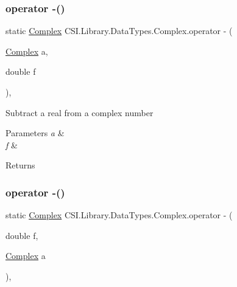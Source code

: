 \subsubsection{\texorpdfstring{operator -\/()}{operator -()}\hspace{0.1cm}{\footnotesize\ttfamily [2/4]}}
{\footnotesize\ttfamily static \mbox{\hyperlink{struct_c_s_i_1_1_library_1_1_data_types_1_1_complex}{Complex}} C\+S\+I.\+Library.\+Data\+Types.\+Complex.\+operator -\/ (\begin{DoxyParamCaption}\item[{\mbox{\hyperlink{struct_c_s_i_1_1_library_1_1_data_types_1_1_complex}{Complex}}}]{a,  }\item[{double}]{f }\end{DoxyParamCaption})\hspace{0.3cm}{\ttfamily [inline]}, {\ttfamily [static]}}



Subtract a real from a complex number 


\begin{DoxyParams}{Parameters}
{\em a} & \\
\hline
{\em f} & \\
\hline
\end{DoxyParams}
\begin{DoxyReturn}{Returns}

\end{DoxyReturn}
\mbox{\label{struct_c_s_i_1_1_library_1_1_data_types_1_1_complex_a57f4d8b72c1b10a3cb364352172dfb08}} 
\subsubsection{\texorpdfstring{operator -\/()}{operator -()}\hspace{0.1cm}{\footnotesize\ttfamily [3/4]}}
{\footnotesize\ttfamily static \mbox{\hyperlink{struct_c_s_i_1_1_library_1_1_data_types_1_1_complex}{Complex}} C\+S\+I.\+Library.\+Data\+Types.\+Complex.\+operator -\/ (\begin{DoxyParamCaption}\item[{double}]{f,  }\item[{\mbox{\hyperlink{struct_c_s_i_1_1_library_1_1_data_types_1_1_complex}{Complex}}}]{a }\end{DoxyParamCaption})\hspace{0.3cm}{\ttfamily [inline]}, {\ttfamily [static]}}




